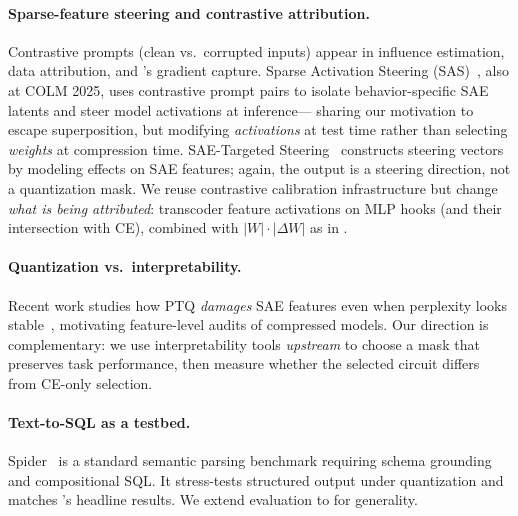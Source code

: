 \paragraph{Sparse-feature steering and contrastive attribution.}
\label{sec:related-steering}
Contrastive prompts (clean vs.\ corrupted inputs) appear in influence estimation, data attribution,
and \baseline{}'s gradient capture.
Sparse Activation Steering (SAS)~\citep{bayat2025sas}, also at COLM 2025, uses contrastive
prompt pairs to isolate behavior-specific SAE latents and steer model activations at inference---
sharing our motivation to escape superposition, but modifying \emph{activations} at test time
rather than selecting \emph{weights} at compression time.
SAE-Targeted Steering~\citep{chalnev2024saets} constructs steering vectors by modeling effects on
SAE features; again, the output is a steering direction, not a quantization mask.
We reuse contrastive calibration infrastructure but change \emph{what is being attributed}:
transcoder feature activations on MLP hooks (and their intersection with CE), combined with
$|W|\cdot|\Delta W|$ as in \baseline{}.

\paragraph{Quantization vs.\ interpretability.}
Recent work studies how PTQ \emph{damages} SAE features even when perplexity looks stable~\citep{quantfeatures2026},
motivating feature-level audits of compressed models.
Our direction is complementary: we use interpretability tools \emph{upstream} to choose a mask that
preserves task performance, then measure whether the selected circuit differs from CE-only selection.

\paragraph{Text-to-SQL as a testbed.}
Spider~\citep{yu2018spider} is a standard semantic parsing benchmark requiring schema grounding
and compositional SQL.
It stress-tests structured output under quantization and matches \baseline{}'s headline results.
We extend evaluation to  for generality.

